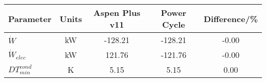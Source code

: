 \begin{tabular}{|p{2.5cm} c c c c|}
    \hline
    \rowcolor{bluepoli!40} %
    \textbf{Parameter} & \textbf{Units} & \textbf{Aspen Plus v11} & \textbf{Power Cycle} & \textbf{Difference/\unit{\percent}} \T\B \\
    \hline \hline
    \(\Dot{W}\) & \unit{\kilo\watt} & -128.21 & -128.21 & -0.00 \T\B\\
    \(\Dot{W}_{elec}\) & \unit{\kilo\watt} & 121.76 & -121.76 & -0.00 \T\B\\
    \(DT_{min}^{cond}\) & \unit{\K} & 5.15 & 5.15 & 0.00 \T\B\\
    \hline
\end{tabular}